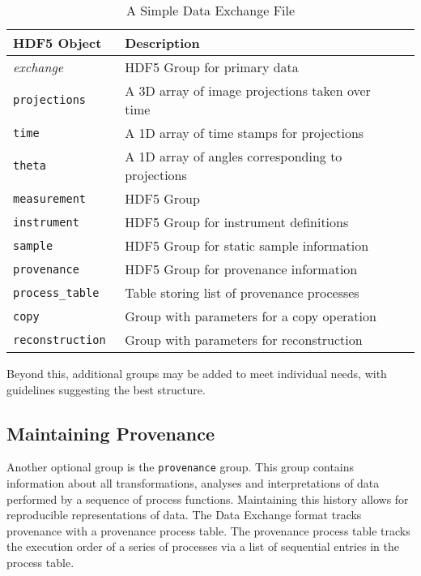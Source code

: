 \documentclass[pdf]{iucr}              %
\begin{document}
\begin{table}
\centering
\footnotesize
\caption{A Simple Data Exchange File}
\label{tab:genrules}
\begin{tabular}{l l l}
\toprule
\bfseries HDF5 Object & \bfseries Description \\
\midrule
\emph{exchange} & HDF5 Group for primary data \\
\hspace{2pt} \tt{projections} & A 3D array of image projections taken over time \\
\hspace{2pt} \tt{time} & A 1D array of time stamps for projections \\
\hspace{2pt} \tt{theta} & A 1D array of angles corresponding to projections  \\
\tt{measurement} & HDF5  Group \\
\hspace{2pt} \tt{instrument} & HDF5 Group for instrument definitions \\
\hspace{2pt} \tt{sample} & HDF5 Group for static sample information \\
\tt{provenance} & HDF5 Group for provenance information \\
\hspace{2pt} \tt{process\_table} & Table storing list of provenance processes \\
\hspace{2pt} \tt{copy} & Group with parameters for a copy operation \\
\hspace{2pt} \tt{reconstruction} & Group with parameters for reconstruction \\
\bottomrule
\end{tabular}
\end{table}


Beyond this, additional groups may be added to meet individual needs, with guidelines suggesting the best structure.


\subsection{Maintaining Provenance}

Another optional group is the \texttt{provenance} group. This group contains information about all transformations, analyses and interpretations of data performed by a sequence of process functions. Maintaining this history allows for reproducible representations of data. The Data Exchange format tracks provenance with a provenance process table. The provenance process table tracks the execution order of a series of processes via a list of sequential entries in the process table.
\end{document}
